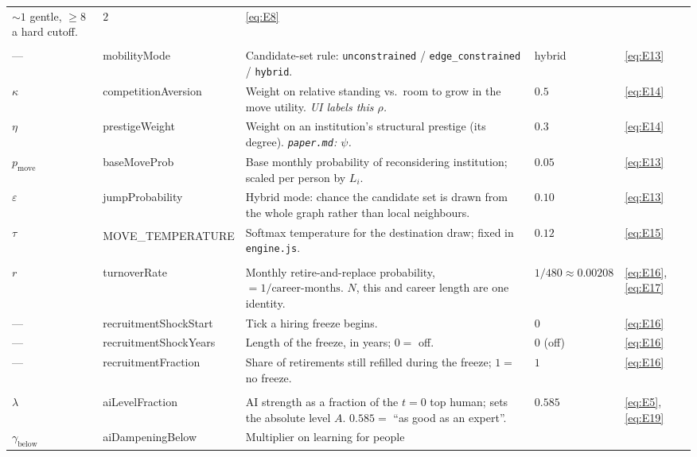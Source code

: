 \documentclass[11pt]{article}
\newcommand{\dither}{\textnormal{---}}
\newcommand{\eqn}[1]{\eqref{eq:#1}}
\newcommand{\dg}{\textsuperscript{\dag}}
\begin{document}
\begin{longtable}{L{1.6cm} K{2.9cm} L{6.8cm} S{2.5cm} S{2.0cm}}
  ${\sim}1$ gentle, $\ge 8$ a hard cutoff.
  & $2$ & \eqn{E8} \\
\addlinespace
{}\\[2pt]
\dither & mobilityMode & Candidate-set rule: \texttt{unconstrained} /
  \texttt{edge\_constrained} / \texttt{hybrid}.
  & hybrid & \eqn{E13} \\
$\kappa$ & competitionAversion & Weight on relative standing vs.\ room to grow in
  the move utility. \emph{UI labels this $\rho$.}
  & $0.5$ & \eqn{E14} \\
$\eta$ & prestigeWeight & Weight on an institution's structural prestige (its
  degree). \emph{\texttt{paper.md}: $\psi$.}
  & $0.3$ & \eqn{E14} \\
$p_{\text{move}}$ & baseMoveProb & Base monthly probability of reconsidering
  institution; scaled per person by $L_i$.
  & $0.05$ & \eqn{E13} \\
$\varepsilon$ & jumpProbability & Hybrid mode: chance the candidate set is drawn
  from the whole graph rather than local neighbours.
  & $0.10$ & \eqn{E13} \\
$\tau$ & MOVE\_TEMPERATURE\dg & Softmax temperature for the destination draw;
  fixed in \texttt{engine.js}.
  & $0.12$ & \eqn{E15} \\
\addlinespace
{}\\[2pt]
$r$ & turnoverRate & Monthly retire-and-replace probability,
  $= 1/\text{career-months}$. $N$, this and career length are one identity.
  & $1/480 \approx 0.00208$ & \eqn{E16}, \eqn{E17} \\
\dither & recruitmentShockStart & Tick a hiring freeze begins.
  & $0$ & \eqn{E16} \\
\dither & recruitmentShockYears & Length of the freeze, in years; $0 = $ off.
  & $0$ (off) & \eqn{E16} \\
\dither & recruitmentFraction & Share of retirements still refilled during the
  freeze; $1 = $ no freeze.
  & $1$ & \eqn{E16} \\
\addlinespace
{}\\[2pt]
$\lambda$ & aiLevelFraction & AI strength as a fraction of the $t=0$ top human;
  sets the absolute level $A$. $0.585 = $ ``as good as an expert''.
  & $0.585$ & \eqn{E5}, \eqn{E19} \\
$\gamma_{\text{below}}$ & aiDampeningBelow & Multiplier on learning for people

\end{longtable}
\end{document}
